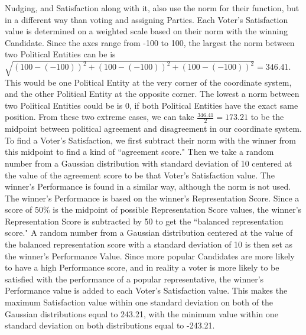 \documentclass[12pt]{article}
\begin{document}
\qquad Nudging, and Satisfaction along with it, also use the norm for their function, but in a different way than voting and assigning Parties. Each Voter's Satisfaction value is determined on a weighted scale based on their norm with the winning Candidate. Since the axes range from -100 to 100, the largest the norm between two Political Entities can be is $\sqrt{(100 - (- 100))^2 + (100 - (- 100))^2 + (100 - (- 100))^2} = 346.41$. This would be one Political Entity at the very corner of the coordinate system, and the other Political Entity at the opposite corner. The lowest a norm between two Political Entities could be is 0, if both Political Entities have the exact same position. From these two extreme cases, we can take $\frac{346.41}{2} = 173.21$ to be the midpoint between political agreement and disagreement in our coordinate system. To find a Voter's Satisfaction, we first subtract their norm with the winner from this midpoint to find a kind of ``agreement score." Then we take a random number from a Gaussian distribution with standard deviation of 10 centered at the value of the agreement score to be that Voter's Satisfaction value. The winner's Performance is found in a similar way, although the norm is not used. The winner's Performance is based on the winner's Representation Score. Since a score of 50\% is the midpoint of possible Representation Score values, the winner's Representation Score is subtracted by 50 to get the ``balanced representation score." A random number from a Gaussian distribution centered at the value of the balanced representation score with a standard deviation of 10 is then set as the winner's Performance Value. Since more popular Candidates are more likely to have a high Performance score, and in reality a voter is more likely to be satisfied with the performance of a popular representative, the winner's Performance value is added to each Voter's Satisfaction value. This makes the maximum Satisfaction value within one standard deviation on both of the Gaussian distributions equal to 243.21, with the minimum value within one standard deviation on both distributions equal to -243.21. \\
\end{document}
